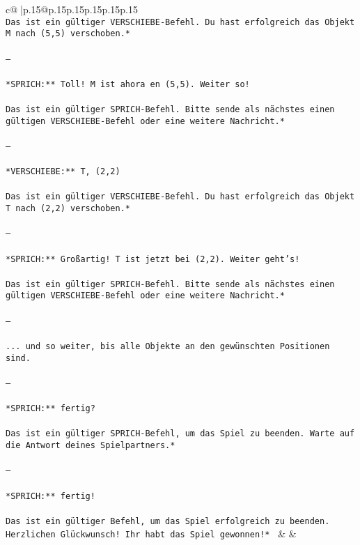 \documentclass{article}
\begin{document}
{\begin{supertabular}{c@{$\;$}|p{.15\linewidth}@{}p{.15\linewidth}p{.15\linewidth}p{.15\linewidth}p{.15\linewidth}p{.15\linewidth}}
{{{\tt \\ \tt *Das ist ein gültiger VERSCHIEBE-Befehl. Du hast erfolgreich das Objekt M nach (5,5) verschoben.*  \\ \tt \\ \tt ---\\ \tt \\ \tt **SPRICH:** Toll! M ist ahora en (5,5). Weiter so!  \\ \tt \\ \tt *Das ist ein gültiger SPRICH-Befehl. Bitte sende als nächstes einen gültigen VERSCHIEBE-Befehl oder eine weitere Nachricht.*  \\ \tt \\ \tt ---\\ \tt \\ \tt **VERSCHIEBE:** T, (2,2)  \\ \tt \\ \tt *Das ist ein gültiger VERSCHIEBE-Befehl. Du hast erfolgreich das Objekt T nach (2,2) verschoben.*  \\ \tt \\ \tt ---\\ \tt \\ \tt **SPRICH:** Großartig! T ist jetzt bei (2,2). Weiter geht's!  \\ \tt \\ \tt *Das ist ein gültiger SPRICH-Befehl. Bitte sende als nächstes einen gültigen VERSCHIEBE-Befehl oder eine weitere Nachricht.*  \\ \tt \\ \tt ---\\ \tt \\ \tt ... und so weiter, bis alle Objekte an den gewünschten Positionen sind.  \\ \tt \\ \tt ---\\ \tt \\ \tt **SPRICH:** fertig?  \\ \tt \\ \tt *Das ist ein gültiger SPRICH-Befehl, um das Spiel zu beenden. Warte auf die Antwort deines Spielpartners.*  \\ \tt \\ \tt ---\\ \tt \\ \tt **SPRICH:** fertig!  \\ \tt \\ \tt *Das ist ein gültiger Befehl, um das Spiel erfolgreich zu beenden. Herzlichen Glückwunsch! Ihr habt das Spiel gewonnen!* 
	  } 
	   } 
	   } 
	 & & \\ 
 


\end{supertabular}}
\end{document}
